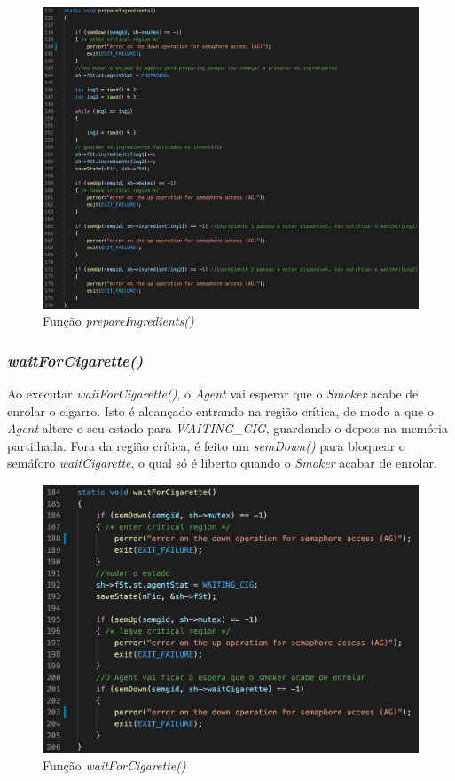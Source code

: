 \documentclass[10pt,portuguese]{article}
\begin{document}
\begin{figure}[!h]
    \centering
    \includegraphics[width=\textwidth]{images/implementation/prepareings.png}
    \caption{Função \textit{prepareIngredients()}}
\end{figure}

\subsubsection{\textit{waitForCigarette()}}

\par Ao executar \textit{waitForCigarette()}, o \textit{Agent} vai esperar que o \textit{Smoker} acabe de enrolar o cigarro. Isto é alcançado entrando na região crítica, de modo a que o \textit{Agent} altere o seu estado para \textit{WAITING\_CIG}, guardando-o depois na memória partilhada. Fora da região crítica, é feito um \textit{semDown()} para bloquear o semáforo \textit{waitCigarette}, o qual só é liberto quando o \textit{Smoker} acabar de enrolar.

\begin{figure}[!h]
    \centering
    \includegraphics[width=\textwidth]{images/implementation/waitcig.png}
    \caption{Função \textit{waitForCigarette()}}
\end{figure}
\end{document}
